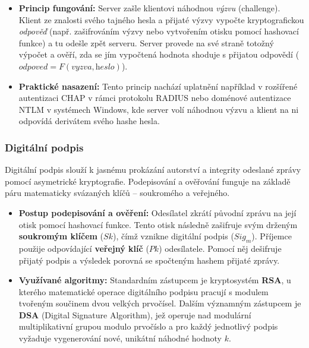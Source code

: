                     \begin{itemize}
                        \item \textbf{Princip fungování:} Server zašle klientovi náhodnou \textit{výzvu} (challenge). Klient ze znalosti svého tajného hesla a přijaté výzvy vypočte kryptografickou \textit{odpověď} (např. zašifrováním výzvy nebo vytvořením otisku pomocí hashovací funkce) a tu odešle zpět serveru. Server provede na své straně totožný výpočet a ověří, zda se jím vypočtená hodnota shoduje s přijatou odpovědí ($\textit{odpoved} = F(\textit{vyzva}, \textit{heslo})$).
                        \item \textbf{Praktické nasazení:} Tento princip nachází uplatnění například v rozšířené autentizaci CHAP v rámci protokolu RADIUS nebo doménové autentizace NTLM v systémech Windows, kde server volí náhodnou výzvu a klient na ni odpovídá derivátem svého hashe hesla.
                    \end{itemize}
                \subsubsection{Digitální podpis}
                    Digitální podpis slouží k jasnému prokázání autorství a integrity odeslané zprávy pomocí asymetrické kryptografie. Podepisování a ověřování funguje na základě páru matematicky svázaných klíčů -- soukromého a veřejného.
                    
                    \begin{itemize}
                        \item \textbf{Postup podepisování a ověření:} Odesílatel zkrátí původní zprávu na její otisk pomocí hashovací funkce. Tento otisk následně zašifruje svým drženým \textbf{soukromým klíčem} ($Sk$), čímž vznikne digitální podpis ($Sig_m$). Příjemce použije odpovídající \textbf{veřejný klíč} ($Pk$) odesílatele. Pomocí něj dešifruje přijatý podpis a výsledek porovná se spočteným hashem přijaté zprávy.
                        \item \textbf{Využívané algoritmy:} Standardním zástupcem je kryptosystém \textbf{RSA}, u kterého matematické operace digitálního podpisu pracují s modulem tvořeným součinem dvou velkých prvočísel. Dalším významným zástupcem je \textbf{DSA} (Digital Signature Algorithm), jež operuje nad modulární multiplikativní grupou modulo prvočíslo a pro každý jednotlivý podpis vyžaduje vygenerování nové, unikátní náhodné hodnoty $k$.
                    \end{itemize}
